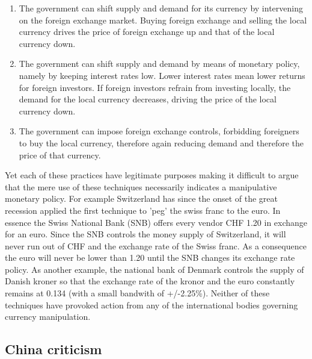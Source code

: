 \documentclass[11pt]{article}
\begin{document}
\begin{enumerate}
\item{The government can shift supply and demand for its currency by intervening on the foreign exchange market. Buying foreign exchange and selling the local currency drives the price of foreign exchange up and that of the local currency down.}
\item{The government can shift supply and demand by means of monetary policy, namely by keeping interest rates low. Lower interest rates mean lower returns for foreign investors. If foreign investors refrain from investing locally, the demand for the local currency decreases, driving the price of the local currency down.}
\item{The government can impose foreign exchange controls, forbidding foreigners to buy the local currency, therefore again reducing demand and therefore the price of that currency.}
\end{enumerate}

Yet each of these practices have legitimate purposes making it difficult 
to argue that the mere use of these techniques necessarily indicates a 
manipulative monetary policy. For example Switzerland has since the 
onset of the great recession applied the first technique to 'peg' the 
swiss franc to the euro. In essence the Swiss National Bank (SNB) offers 
every vendor CHF 1.20 in exchange for an euro. Since the SNB controls 
the money supply of Switzerland, it will never run out of CHF and the 
exchange rate of the Swiss franc. As a consequence the euro will never 
be lower than 1.20 until the SNB changes its exchange rate policy.  As 
another example, the national bank of Denmark controls the supply of 
Danish kroner so that the exchange rate of the kronor and the euro 
constantly remains at 0.134 (with a small bandwith of +/-2.25\%).  
Neither of these techniques have provoked action from any of the 
international bodies governing currency manipulation.



\subsection{China criticism}
\end{document}
